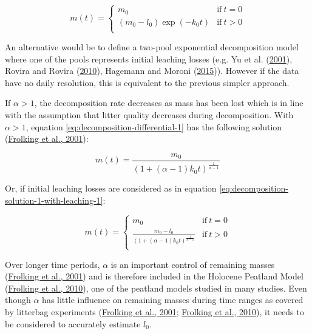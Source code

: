 \documentclass[
  12pt,
]{article}
\begin{document}
\begin{equation}
m(t) = \begin{cases}
m_0 & \mathrm{if}~t=0\\
(m_0 - l_0) \exp(-k_0 t) & \mathrm{if}~t>0\\
\end{cases}
\label{eq:decomposition-solution-1-with-leaching-1}
\end{equation}

An alternative would be to define a two-pool exponential decomposition model where one of the pools represents initial leaching losses (e.g. Yu et al. (\protect\hyperlink{ref-Yu.2001}{2001}), Rovira and Rovira (\protect\hyperlink{ref-Rovira.2010}{2010}), Hagemann and Moroni (\protect\hyperlink{ref-Hagemann.2015}{2015})). However if the data have no daily resolution, this is equivalent to the previous simpler approach.

If \(\alpha>1\), the decomposition rate decreases as mass has been lost which is in line with the assumption that litter quality decreases during decomposition. With \(\alpha>1\), equation \eqref{eq:decomposition-differential-1} has the following solution (\protect\hyperlink{ref-Frolking.2001}{Frolking et al., 2001}):

\begin{equation}
m(t) = \frac{m_0}{(1 + (\alpha - 1) k_0 t)^{\frac{1}{\alpha - 1}}}
\label{eq:decomposition-solution-2-no-leaching-1}
\end{equation}

Or, if initial leaching losses are considered as in equation \eqref{eq:decomposition-solution-1-with-leaching-1}:

\begin{equation}
m(t) = \begin{cases}
m_0 & \mathrm{if}~t=0\\
\frac{m_0 - l_0}{(1 + (\alpha - 1) k_0 t)^{\frac{1}{\alpha - 1}}} & \mathrm{if}~t>0\\
\end{cases}
\label{eq:decomposition-solution-2-with-leaching-1}
\end{equation}

Over longer time periods, \(\alpha\) is an important control of remaining masses (\protect\hyperlink{ref-Frolking.2001}{Frolking et al., 2001}) and is therefore included in the Holocene Peatland Model (\protect\hyperlink{ref-Frolking.2010}{Frolking et al., 2010}), one of the peatland models studied in many studies. Even though \(\alpha\) has little influence on remaining masses during time ranges as covered by litterbag experiments (\protect\hyperlink{ref-Frolking.2001}{Frolking et al., 2001}; \protect\hyperlink{ref-Frolking.2010}{Frolking et al., 2010}), it needs to be considered to accurately estimate \(l_0\).
\end{document}
